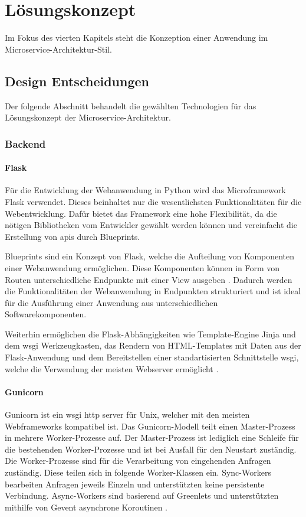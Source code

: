 \chapter{Lösungskonzept}\label{loesungskonzept}
Im Fokus des vierten Kapitels steht die Konzeption einer Anwendung im Microservice-Architektur-Stil.

\section{Design Entscheidungen}

Der folgende Abschnitt behandelt die gewählten Technologien für das Lösungskonzept der Microservice-Architektur.

\subsection{Backend}

\subsubsection{Flask}
Für die Entwicklung der Webanwendung in Python wird das Microframework Flask verwendet.
Dieses beinhaltet nur die wesentlichsten Funktionalitäten für die Webentwicklung.
Dafür bietet das Framework eine hohe Flexibilität, da die nötigen Bibliotheken vom Entwickler gewählt werden können \cite{flaskdocu} und
vereinfacht die Erstellung von \acs{api}s \cite[S.11]{restfulpython} durch Blueprints.

Blueprints sind ein Konzept von Flask, welche die Aufteilung von Komponenten einer Webanwendung ermöglichen.
Diese Komponenten können in Form von Routen unterschiedliche Endpunkte mit einer View ausgeben \cite{flaskdocu}.
Dadurch werden die Funktionalitäten der Webanwendung in Endpunkten strukturiert und ist ideal für die Ausführung einer Anwendung aus unterschiedlichen Softwarekomponenten.

Weiterhin ermöglichen die Flask-Abhängigkeiten wie Template-Engine Jinja und dem \acs{wsgi} Werkzeugkasten,
das Rendern von HTML-Templates mit Daten aus der Flask-Anwendung
und dem Bereitstellen einer standartisierten Schnittstelle \ac{wsgi}, welche die Verwendung der meisten Webserver ermöglicht \cite{flaskdocu}.


\subsubsection{Gunicorn}
Gunicorn ist ein \acs{wsgi} \acs{http} server für Unix, welcher mit den meisten Webframeworks kompatibel ist.
Das Gunicorn-Modell teilt einen Master-Prozess in mehrere Worker-Prozesse auf.
Der Master-Prozess ist lediglich eine Schleife für die bestehenden Worker-Prozesse
und ist bei Ausfall für den Neustart zuständig.
Die Worker-Prozesse sind für die Verarbeitung von eingehenden Anfragen zuständig.
Diese teilen sich in folgende Worker-Klassen ein. 
Sync-Workers bearbeiten Anfragen jeweils Einzeln und unterstützten keine persistente Verbindung.
Async-Workers sind basierend auf Greenlets und unterstützten mithilfe von Gevent asynchrone Koroutinen \cite{gunciorndocs}. 

